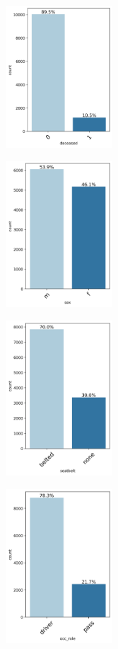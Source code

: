 \documentclass[12pt,a4paper]{article}
\begin{document}
	\begin{figure}[h]
		\centering
		\begin{subfigure}[t]{0.24\textwidth}
			\centering
			\includegraphics[width=4cm]{deceased_dist.png}
			\caption{}
			\label{fig:deceased_dist}
		\end{subfigure}
		\hfill
		\begin{subfigure}[t]{0.24\textwidth}
			\centering
			\includegraphics[width=4cm]{sex_dist.png}
			\caption{}
			\label{fig:sex_dist}
		\end{subfigure}
		\hfill
		\begin{subfigure}[t]{0.24\textwidth}
			\centering
			\includegraphics[width=4cm]{seatbelt_dist.png}
			\caption{}
			\label{fig:seatbelt_dist}
		\end{subfigure}
		\hfill
		\begin{subfigure}[t]{0.24\textwidth}
			\centering
			\includegraphics[width=4cm]{occ_role_dist.png}

\end{subfigure}
\end{figure}
\end{document}
